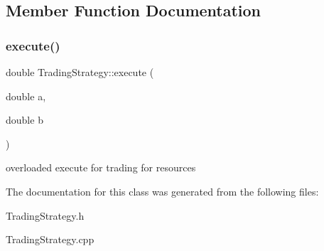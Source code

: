 \subsection{Member Function Documentation}
\mbox{\label{classTradingStrategy_a4029029df708f9f0f013603b19f449ff}} 
\subsubsection{\texorpdfstring{execute()}{execute()}}
{\footnotesize\ttfamily double Trading\+Strategy\+::execute (\begin{DoxyParamCaption}\item[{double}]{a,  }\item[{double}]{b }\end{DoxyParamCaption})\hspace{0.3cm}{\ttfamily [virtual]}}

overloaded execute for trading for resources 

The documentation for this class was generated from the following files\+:\begin{DoxyCompactItemize}
\item 
Trading\+Strategy.\+h\item 
Trading\+Strategy.\+cpp\end{DoxyCompactItemize}
